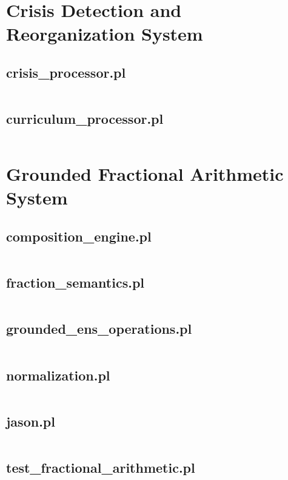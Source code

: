 \documentclass{article}
\begin{document}
\section{Crisis Detection and Reorganization System}
\subsection{crisis\_processor.pl}
\inputminted{prolog}{crisis_processor.pl}
\subsection{curriculum\_processor.pl}
\inputminted{prolog}{curriculum_processor.pl}

\section{Grounded Fractional Arithmetic System}
\subsection{composition\_engine.pl}
\inputminted{prolog}{composition_engine.pl}
\subsection{fraction\_semantics.pl}
\inputminted{prolog}{fraction_semantics.pl}
\subsection{grounded\_ens\_operations.pl}
\inputminted{prolog}{grounded_ens_operations.pl}
\subsection{normalization.pl}
\inputminted{prolog}{normalization.pl}
\subsection{jason.pl}
\inputminted{prolog}{jason.pl}
\subsection{test\_fractional\_arithmetic.pl}
\inputminted{prolog}{test_fractional_arithmetic.pl}

\end{document}
